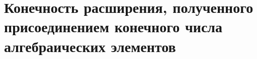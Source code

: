 \section{Конечность расширения, полученного присоединением конечного числа алгебраических элементов}
